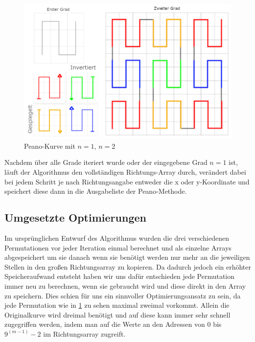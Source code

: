 \documentclass[course=asp]{aspdoc}
\begin{document}
\begin{figure}[ht]
\centering
\includegraphics[scale=0.32]{PeanoFarbcodiert.png}
\caption{Peano-Kurve mit $n = 1$, $n = 2$}\label{Abb:Peano L\"osungsidee}
\end{figure}

Nachdem \"uber alle Grade iteriert wurde oder der eingegebene Grad $n = 1$ ist, l\"auft der Algorithmus den vollst\"andigen Richtungs-Array durch, ver\"andert dabei bei jedem Schritt je nach Richtungsangabe entweder die x oder y-Koordinate und speichert diese dann in die Ausgabeliste der Peano-Methode.

\subsection{Umgesetzte Optimierungen} \label{Umgesetzte Optimierungen}

Im urspr\"unglichen Entwurf des Algorithmus wurden die drei verschiedenen Permutationen vor jeder Iteration einmal berechnet und als einzelne Arrays abgespeichert um sie danach wenn sie ben\"otigt werden nur mehr an die jeweiligen Stellen in den gro\ss en Richtungsarray zu kopieren. Da dadurch jedoch ein erh\"ohter Speicheraufwand entsteht haben wir uns daf\"ur entschieden jede Permutation immer neu zu berechnen, wenn sie gebraucht wird und diese direkt in den Array zu speichern. Dies schien f\"ur uns ein sinnvoller Optimierungsansatz zu sein, da jede Permutation wie in \ref{Abb:Peano L\"osungsidee} zu sehen maximal zweimal vorkommt. Allein die Originalkurve wird dreimal ben\"otigt und auf diese kann immer sehr schnell zugegriffen werden, indem man auf die Werte an den Adressen von $0$ bis $9^{(m - 1)} - 2$ im Richtungsarray zugreift. 
\end{document}
